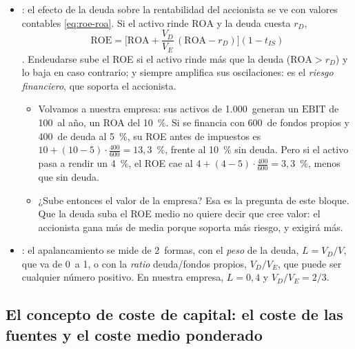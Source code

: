 \documentclass[11pt]{article}
\begin{document}
\begin{itemize}
\item {}: el efecto de la deuda sobre la rentabilidad del accionista se ve con valores contables \eqref{eq:roe-roa}. Si el activo rinde $\mathrm{ROA}$ y la deuda cuesta $r_D$,
  \begin{equation}\label{eq:roe-roa}
  \mathrm{ROE}=\Big[\mathrm{ROA}+\frac{V_D}{V_E}\,(\mathrm{ROA}-r_D)\Big](1-t_{IS})
  \end{equation}
  . Endeudarse sube el ROE si el activo rinde más que la deuda ($\mathrm{ROA}>r_D$) y lo baja en caso contrario; y siempre amplifica sus oscilaciones: es el \emph{riesgo financiero}, que soporta el accionista.
  \begin{itemize}
  \item Volvamos a nuestra empresa: sus activos de 1.000~generan un $\mathrm{EBIT}$ de 100~al año, un ROA del 10~\%. Si se financia con 600~de fondos propios y 400~de deuda al 5~\%, su ROE antes de impuestos es $10+(10-5)\cdot\tfrac{400}{600}=13{,}3$~\%, frente al 10~\% sin deuda. Pero si el activo pasa a rendir un 4~\%, el ROE cae al $4+(4-5)\cdot\tfrac{400}{600}=3{,}3$~\%, menos que sin deuda.
  \item ¿Sube entonces el valor de la empresa? Esa es la pregunta de este bloque. Que la deuda suba el ROE medio no quiere decir que cree valor: el accionista gana más de media porque soporta más riesgo, y exigirá más.
  \end{itemize}
\item {}: el apalancamiento se mide de 2~formas, con el \emph{peso} de la deuda, $L=V_D/V$, que va de 0~a 1, o con la \emph{ratio} deuda/fondos propios, $V_D/V_E$, que puede ser cualquier número positivo. En nuestra empresa, $L=0{,}4$ y $V_D/V_E=2/3$.
\end{itemize}

\subsection{El concepto de coste de capital:\cortetitulo{} el coste de las fuentes y el coste medio ponderado}\label{sec:coste-capital}
\end{document}
